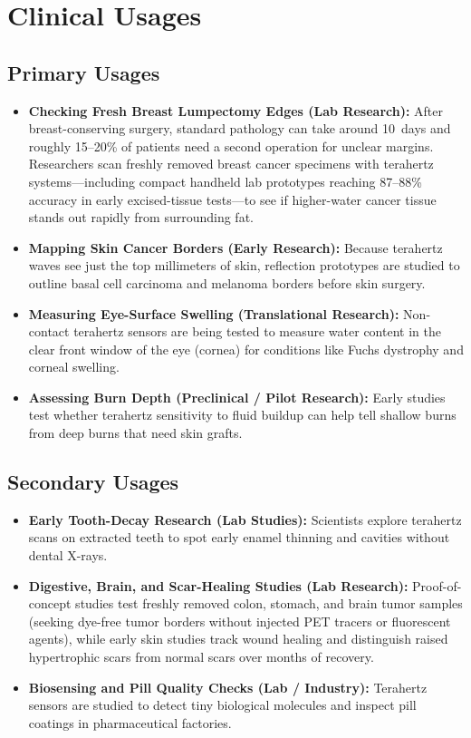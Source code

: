 \section{Clinical Usages}

\subsection{Primary Usages}
\begin{itemize}
  \item \textbf{Checking Fresh Breast Lumpectomy Edges (Lab Research):} After breast-conserving surgery, standard pathology can take around 10~days and roughly 15--20\% of patients need a second operation for unclear margins. Researchers scan freshly removed breast cancer specimens with terahertz systems---including compact handheld lab prototypes reaching 87--88\% accuracy in early excised-tissue tests---to see if higher-water cancer tissue stands out rapidly from surrounding fat.
  \item \textbf{Mapping Skin Cancer Borders (Early Research):} Because terahertz waves see just the top millimeters of skin, reflection prototypes are studied to outline basal cell carcinoma and melanoma borders before skin surgery.
  \item \textbf{Measuring Eye-Surface Swelling (Translational Research):} Non-contact terahertz sensors are being tested to measure water content in the clear front window of the eye (cornea) for conditions like Fuchs dystrophy and corneal swelling.
  \item \textbf{Assessing Burn Depth (Preclinical / Pilot Research):} Early studies test whether terahertz sensitivity to fluid buildup can help tell shallow burns from deep burns that need skin grafts.
\end{itemize}

\subsection{Secondary Usages}
\begin{itemize}
  \item \textbf{Early Tooth-Decay Research (Lab Studies):} Scientists explore terahertz scans on extracted teeth to spot early enamel thinning and cavities without dental X-rays.
  \item \textbf{Digestive, Brain, and Scar-Healing Studies (Lab Research):} Proof-of-concept studies test freshly removed colon, stomach, and brain tumor samples (seeking dye-free tumor borders without injected PET tracers or fluorescent agents), while early skin studies track wound healing and distinguish raised hypertrophic scars from normal scars over months of recovery.
  \item \textbf{Biosensing and Pill Quality Checks (Lab / Industry):} Terahertz sensors are studied to detect tiny biological molecules and inspect pill coatings in pharmaceutical factories.
\end{itemize}

